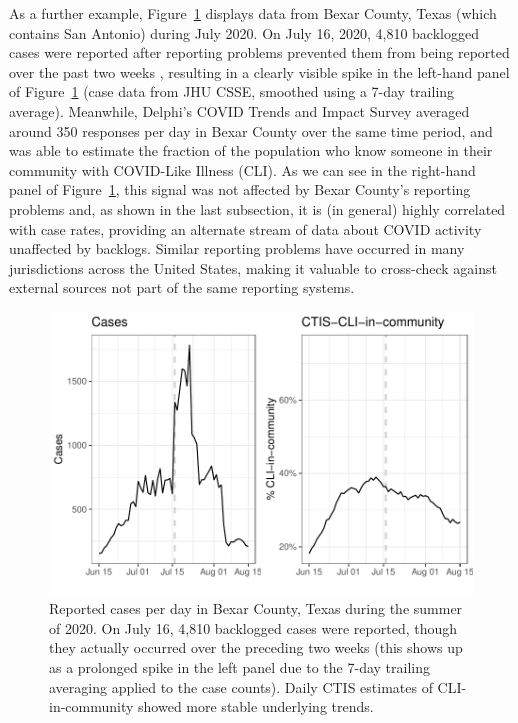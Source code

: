 \documentclass[9pt,twocolumn,twoside,lineno]{pnas-new}
\begin{document}
As a further example, Figure~\ref{fig:bexar_compare} displays data from Bexar
County, Texas (which contains San Antonio) during July 2020. On July 16, 2020,
4,810 backlogged cases were reported after reporting problems prevented them
from being reported over the past two weeks \cite{Palacios:2021}, resulting in a
clearly visible spike in the left-hand panel of Figure~\ref{fig:bexar_compare}
(case data from JHU CSSE, smoothed using a 7-day trailing average).  Meanwhile,
Delphi's COVID Trends and Impact Survey averaged around 350 responses per day in
Bexar County over the same time period, and was able to estimate the fraction of
the population who know someone in their community with COVID-Like Illness
(CLI). As we can see in the right-hand panel of Figure~\ref{fig:bexar_compare},
this signal was not affected by Bexar County's reporting problems and, as shown
in the last subsection, it is (in general) highly correlated with case rates,
providing an alternate stream of data about COVID activity unaffected by
backlogs. Similar reporting problems have occurred in many jurisdictions across
the United States, making it valuable to cross-check against external sources
not part of the same reporting systems.

\begin{figure}[t]
  \includegraphics[width=\columnwidth]{fig/bexar_compare.pdf}
  \caption{Reported cases per day in Bexar County, Texas during the summer of
    2020. On July 16, 4,810 backlogged cases were reported, though they actually
    occurred over the preceding two weeks (this shows up as a prolonged spike in
    the left panel due to the 7-day trailing averaging applied to the case
    counts). Daily CTIS estimates of CLI-in-community showed more stable 
    underlying trends.}
  \label{fig:bexar_compare}
\end{figure}
\end{document}
